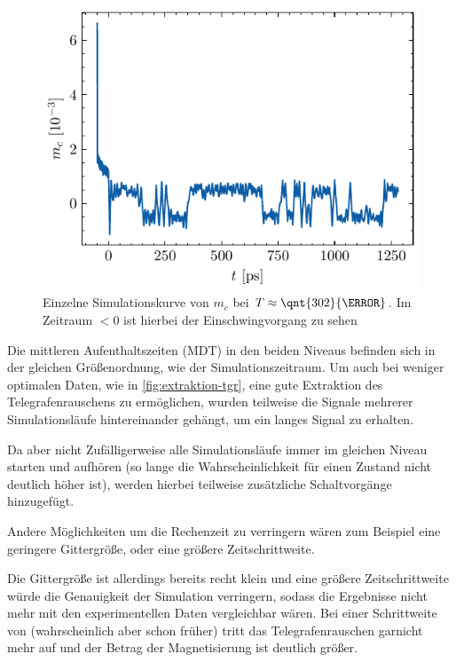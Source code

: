 \documentclass[main.tex]{subfiles}
\begin{document}
\begin{figure}[h]
    \centering
    \includegraphics{bilder/plots/theo-vis/example-telegraph-sim.pdf}
    \caption{Einzelne Simulationskurve von \(m_c\) bei \(T \approx \qnt{302}{\kelvin}\). Im Zeitraum \(<0\) ist hierbei der Einschwingvorgang zu sehen
    }\label{fig:bsp-run}
\end{figure}

Die mittleren Aufenthaltszeiten (MDT) in den beiden Niveaus befinden sich in der gleichen Größenordnung, wie der Simulationszeitraum. Um auch bei weniger optimalen Daten, wie in \cref{fig:extraktion-tgr}, eine gute Extraktion des Telegrafenrauschens zu ermöglichen, wurden teilweise die Signale mehrerer Simulationsläufe hintereinander gehängt, um ein langes Signal zu erhalten.

Da aber nicht Zufälligerweise alle Simulationsläufe immer im gleichen Niveau starten und aufhören (so lange die Wahrscheinlichkeit für einen Zustand nicht deutlich höher ist), werden hierbei teilweise zusätzliche Schaltvorgänge hinzugefügt. 

Andere Möglichkeiten um die Rechenzeit zu verringern wären zum Beispiel eine geringere Gittergröße, oder eine größere Zeitschrittweite.

Die Gittergröße ist allerdings bereits recht klein und eine größere Zeitschrittweite würde die Genauigkeit der Simulation verringern, sodass die Ergebnisse nicht mehr mit den experimentellen Daten vergleichbar wären. Bei einer Schrittweite von  (wahrscheinlich aber schon früher) tritt das Telegrafenrauschen garnicht mehr auf und der Betrag der Magnetisierung ist deutlich größer.
\end{document}
